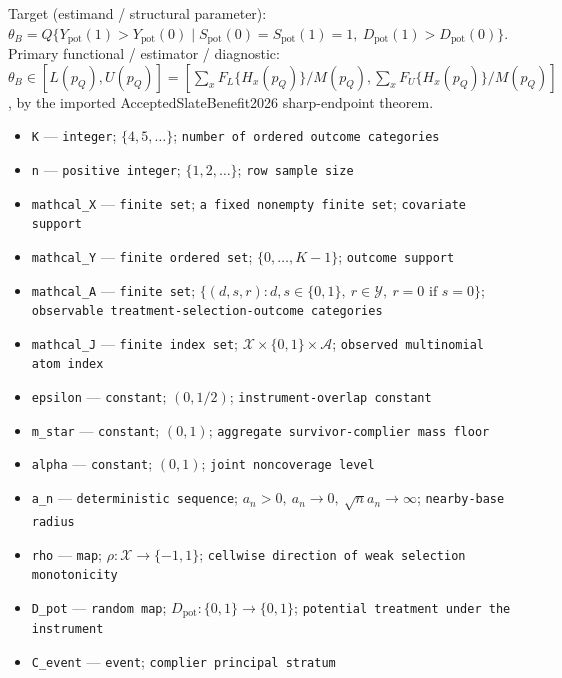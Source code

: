 \documentclass{article}
\begin{document}
Target (estimand / structural parameter): \(\theta_B=Q\{Y_{\mathrm{pot}}(1)>Y_{\mathrm{pot}}(0)\mid S_{\mathrm{pot}}(0)=S_{\mathrm{pot}}(1)=1,\ D_{\mathrm{pot}}(1)>D_{\mathrm{pot}}(0)\}\).
Primary functional / estimator / diagnostic: \(\theta_B\in[L(p_Q),U(p_Q)]=\left[\sum_xF_L\{H_x(p_Q)\}/M(p_Q),\sum_xF_U\{H_x(p_Q)\}/M(p_Q)\right]\), by the imported AcceptedSlateBenefit2026 sharp-endpoint theorem.
\begin{itemize}
  \item \texttt{K} --- \texttt{integer}; \(\{4,5,\ldots\}\); \texttt{number of ordered outcome categories}
  \item \texttt{n} --- \texttt{positive integer}; \(\{1,2,\ldots\}\); \texttt{row sample size}
  \item \texttt{mathcal\_\allowbreak{}X} --- \texttt{finite set}; \texttt{a fixed nonempty finite set}; \texttt{covariate support}
  \item \texttt{mathcal\_\allowbreak{}Y} --- \texttt{finite ordered set}; \(\{0,\ldots,K-1\}\); \texttt{outcome support}
  \item \texttt{mathcal\_\allowbreak{}A} --- \texttt{finite set}; \(\{(d,s,r):d,s\in\{0,1\},\ r\in\mathcal Y,\ r=0\text{ if }s=0\}\); \texttt{observable treatment-\allowbreak{}selection-\allowbreak{}outcome categories}
  \item \texttt{mathcal\_\allowbreak{}J} --- \texttt{finite index set}; \(\mathcal X\times\{0,1\}\times\mathcal A\); \texttt{observed multinomial atom index}
  \item \texttt{epsilon} --- \texttt{constant}; \((0,1/2)\); \texttt{instrument-\allowbreak{}overlap constant}
  \item \texttt{m\_\allowbreak{}star} --- \texttt{constant}; \((0,1)\); \texttt{aggregate survivor-\allowbreak{}complier mass floor}
  \item \texttt{alpha} --- \texttt{constant}; \((0,1)\); \texttt{joint noncoverage level}
  \item \texttt{a\_\allowbreak{}n} --- \texttt{deterministic sequence}; \(a_n>0,\ a_n\to0,\ \sqrt n a_n\to\infty\); \texttt{nearby-\allowbreak{}base radius}
  \item \texttt{rho} --- \texttt{map}; \(\rho:\mathcal X\to\{-1,1\}\); \texttt{cellwise direction of weak selection monotonicity}
  \item \texttt{D\_\allowbreak{}pot} --- \texttt{random map}; \(D_{\mathrm{pot}}:\{0,1\}\to\{0,1\}\); \texttt{potential treatment under the instrument}
  \item \texttt{C\_\allowbreak{}event} --- \texttt{event}; \texttt{complier principal stratum}

\end{itemize}
\end{document}

